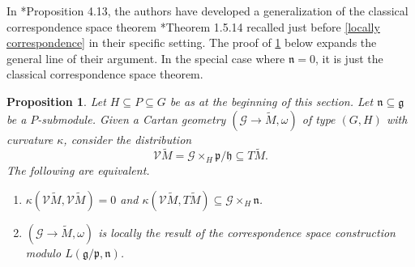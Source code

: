 \documentclass[11pt]{amsart}
\newtheorem{proposition}{Proposition}
\begin{document}
In \cite{Ham+17}*{Proposition 4.13}, the authors have developed a generalization of the classical correspondence space theorem \cite{Book}*{Theorem 1.5.14} recalled just before \cref{locally correspondence} in their specific setting. The proof of \cref{modified correspondence} below expands the general line of their argument. In the special case where $\mathfrak n=0$, it is just the classical correspondence space theorem. 
\begin{proposition}\label{modified correspondence}
Let $H\subseteq P\subseteq G$ be as at the beginning of this section. Let $\mathfrak n\subseteq\mathfrak g$ be a $P$-submodule. Given a Cartan geometry $(\mathcal G\to\tilde M,\omega)$ of type $(G,H)$ with curvature $\kappa$, consider the 
distribution
\[\mathcal V\tilde M=\mathcal G\times_H\mathfrak p/\mathfrak h\subseteq T\tilde M.\]
The following are equivalent.
\begin{enumerate}
\item [(i)] $\kappa(\mathcal V\tilde M,\mathcal V\tilde M)=0$ and $\kappa(\mathcal V\tilde M,T\tilde M)\subseteq\mathcal G\times_H\mathfrak n$.
\item [(ii)] $(\mathcal G\to\tilde M,\omega)$ is locally the result of the correspondence space construction modulo $L(\mathfrak g/\mathfrak p,\mathfrak n)$. 
\end{enumerate}
\end{proposition}
\end{document}
